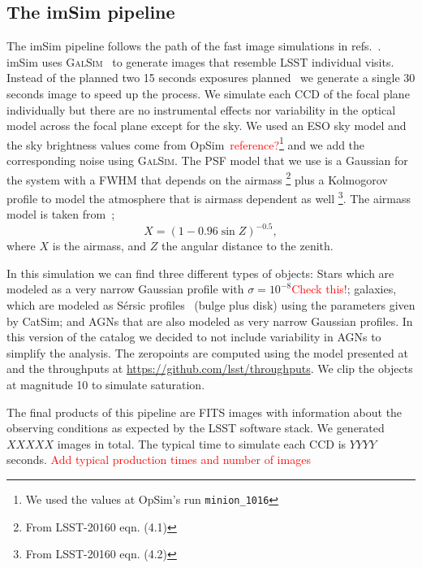 \documentclass[\docopts]{\docclass}
\begin{document}
\subsection{The imSim pipeline}
\label{sec:imsim_pipeline}

The imSim pipeline follows the path of the fast image simulations in refs.~\citep{2016MNRAS.457..786S,2016ApJ...817...25B}.
imSim uses \textsc{GalSim}~\citep{2015A&C....10..121R} to generate images that resemble LSST individual visits. Instead of the
planned two 15 seconds exposures planned~\citep{2008arXiv0805.2366I} we generate a single 30 seconds image to speed up the process.
We simulate each CCD of the focal plane individually but there are no instrumental effects nor variability in the optical model
across the focal plane except for the sky. We used an ESO sky model and the sky brightness values come from
OpSim~\textcolor{red}{reference?}\footnote{We used the values at OpSim's run \texttt{minion\_1016}} and we add the corresponding
noise using \textsc{GalSim}. The PSF model that we use is a Gaussian for the system with a FWHM that depends on the airmass
\footnote{From LSST-20160 eqn. (4.1)} plus a Kolmogorov profile to model the atmosphere that is airmass dependent as well
\footnote{From LSST-20160 eqn. (4.2)}. The airmass model is taken from~\citep{1991PASP..103.1033K};
\begin{equation}
X = (1 - 0.96\sin{Z})^{-0.5},
\end{equation}
where $X$ is the airmass, and $Z$ the angular distance to the zenith.

In this simulation we can find three different types of objects: Stars which are modeled as a very narrow Gaussian profile
with $\sigma=10^{-8}$\textcolor{red}{Check this!}; galaxies, which are modeled as S\'{e}rsic profiles~\citep{1963BAAA....6...41S} (bulge plus disk) using
the parameters given by CatSim; and AGNs that are also modeled as very narrow Gaussian profiles. In this version of the catalog we decided
to not include variability in AGNs to simplify the analysis. The zeropoints are computed using the model presented at~\citep{2008arXiv0805.2366I} and the
throughputs at \url{https://github.com/lsst/throughputs}. We clip the objects at magnitude 10 to simulate saturation.

The final products of this pipeline are FITS images with information about the observing conditions as expected by the LSST software stack. We generated
$XXXXX$ images in total. The typical time to simulate each CCD is $YYYY$ seconds.
\textcolor{red}{Add typical production times and number of images}
\end{document}
